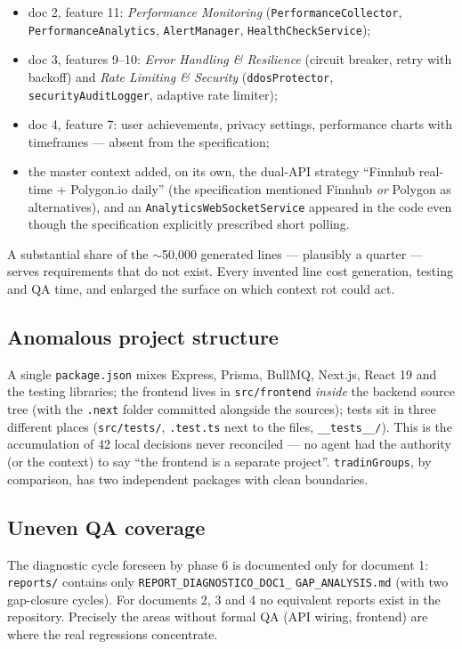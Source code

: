 \documentclass[11pt,a4paper]{article}
\newcommand{\file}[1]{\texttt{\small #1}}
\begin{document}
\begin{itemize}[leftmargin=1.5em]
  \item doc 2, feature 11: \emph{Performance Monitoring} (\file{PerformanceCollector}, \file{PerformanceAnalytics}, \file{AlertManager}, \file{HealthCheckService});
  \item doc 3, features 9--10: \emph{Error Handling \& Resilience} (circuit breaker, retry with backoff) and \emph{Rate Limiting \& Security} (\file{ddosProtector}, \file{securityAuditLogger}, adaptive rate limiter);
  \item doc 4, feature 7: user achievements, privacy settings, performance charts with timeframes --- absent from the specification;
  \item the master context added, on its own, the dual-API strategy ``Finnhub real-time + Polygon.io daily'' (the specification mentioned Finnhub \emph{or} Polygon as alternatives), and an \file{AnalyticsWebSocketService} appeared in the code even though the specification explicitly prescribed short polling.
\end{itemize}

A substantial share of the $\sim$50{,}000 generated lines --- plausibly a quarter --- serves requirements that do not exist. Every invented line cost generation, testing and QA time, and enlarged the surface on which context rot could act.

\subsection{Anomalous project structure}

A single \file{package.json} mixes Express, Prisma, BullMQ, Next.js, React 19 and the testing libraries; the frontend lives in \file{src/frontend} \emph{inside} the backend source tree (with the \file{.next} folder committed alongside the sources); tests sit in three different places (\file{src/tests/}, \file{*.test.ts} next to the files, \file{\_\_tests\_\_/}). This is the accumulation of 42 local decisions never reconciled --- no agent had the authority (or the context) to say ``the frontend is a separate project''. \file{tradinGroups}, by comparison, has two independent packages with clean boundaries.

\subsection{Uneven QA coverage}

The diagnostic cycle foreseen by phase 6 is documented only for document 1: \file{reports/} contains only \file{REPORT\_DIAGNOSTICO\_DOC1\_} \file{GAP\_ANALYSIS.md} (with two gap-closure cycles). For documents 2, 3 and 4 no equivalent reports exist in the repository. Precisely the areas without formal QA (API wiring, frontend) are where the real regressions concentrate.
\end{document}
